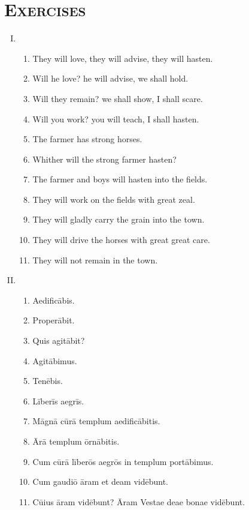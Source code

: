 \documentclass[12pt]{article}
\begin{document}
\section{\textsc{Exercises}}
\begin{enumerate}[I.]
	\setlength{\itemsep}{1em}
	\item \begin{enumerate}[1)]
		\item They will love, they will advise, they will hasten.
		\item Will he love? he will advise, we shall hold.
		\item Will they remain? we shall show, I shall scare.
		\item Will you work? you will teach, I shall hasten.
		\item The farmer has strong horses.
		\item Whither will the strong farmer hasten?
		\item The farmer and boys will hasten into the fields.
		\item They will work on the fields with great zeal.
		\item They will gladly carry the grain into the town.
		\item They will drive the horses with great great care.
		\item They will not remain in the town.
	\end{enumerate}
	\item \begin{enumerate}[1)]
		\item Aedificābis.
		\item Properābit.
		\item Quis agitābit?
		\item Agitābimus.
		\item Tenēbis.
		\item Līberīs aegrīs.
		\item Māgnā cūrā templum aedificābitis.
		\item Ārā templum ōrnābitis.
		\item Cum cūrā līberōs aegrōs in templum portābimus.
		\item Cum gaudiō āram et deam vidēbunt.
		\item Cūius āram vidēbunt? Āram Vestae deae bonae vidēbunt.
	\end{enumerate}
\end{enumerate}
\end{document}
